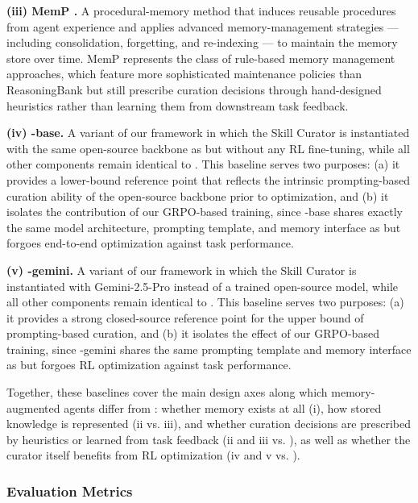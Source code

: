 \noindent\textbf{(iii) MemP \citep{DBLP:journals/corr/abs-2508-06433}.} A procedural-memory method that induces reusable procedures from agent experience and applies advanced memory-management strategies — including consolidation, forgetting, and re-indexing — to maintain the memory store over time. MemP represents the class of rule-based memory management approaches, which feature more sophisticated maintenance policies than ReasoningBank but still prescribe curation decisions through hand-designed heuristics rather than learning them from downstream task feedback.

\noindent\textbf{(iv) \ours{}-base.} A variant of our framework in which the Skill Curator is instantiated with the same open-source backbone as \ours{} but without any RL fine-tuning, while all other components remain identical to \ours{}. This baseline serves two purposes: (a) it provides a lower-bound reference point that reflects the intrinsic prompting-based curation ability of the open-source backbone prior to optimization, and (b) it isolates the contribution of our GRPO-based training, since \ours{}-base shares exactly the same model architecture, prompting template, and memory interface as \ours{} but forgoes end-to-end optimization against task performance.

\noindent\textbf{(v) \ours{}-gemini.} A variant of our framework in which the Skill Curator is instantiated with Gemini-2.5-Pro instead of a trained open-source model, while all other components remain identical to \ours{}. This baseline serves two purposes: (a) it provides a strong closed-source reference point for the upper bound of prompting-based curation, and (b) it isolates the effect of our GRPO-based training, since \ours{}-gemini shares the same prompting template and memory interface as \ours{} but forgoes RL optimization against task performance.

Together, these baselines cover the main design axes along which memory-augmented agents differ from \ours{}: whether memory exists at all (i), how stored knowledge is represented (ii vs. iii), and whether curation decisions are prescribed by heuristics or learned from task feedback (ii and iii vs. \ours{}), as well as whether the curator itself benefits from RL optimization (iv and v vs. \ours{}).

\subsubsection{Evaluation Metrics}

